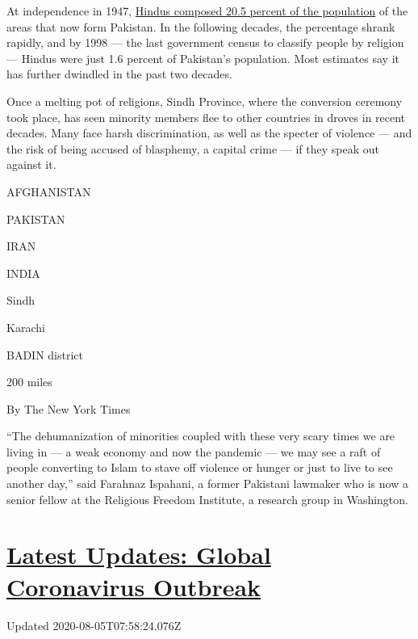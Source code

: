 At independence in 1947,
\href{https://theprint.in/opinion/modi-critics-decry-india-mistreating-minorities-but-cant-whitewash-pak-islamisation/355536/}{Hindus
composed 20.5 percent of the population} of the areas that now form
Pakistan. In the following decades, the percentage shrank rapidly, and
by 1998 --- the last government census to classify people by religion
--- Hindus were just 1.6 percent of Pakistan's population. Most
estimates say it has further dwindled in the past two decades.

Once a melting pot of religions, Sindh Province, where the conversion
ceremony took place, has seen minority members flee to other countries
in droves in recent decades. Many face harsh discrimination, as well as
the specter of violence --- and the risk of being accused of blasphemy,
a capital crime --- if they speak out against it.

AFGHANISTAN

PAKISTAN

IRAN

INDIA

Sindh

Karachi

BADIN district

200 miles

By The New York Times

``The dehumanization of minorities coupled with these very scary times
we are living in --- a weak economy and now the pandemic --- we may see
a raft of people converting to Islam to stave off violence or hunger or
just to live to see another day,'' said Farahnaz Ispahani, a former
Pakistani lawmaker who is now a senior fellow at the Religious Freedom
Institute, a research group in Washington.

\hypertarget{latest-updates-global-coronavirus-outbreak}{%
\section{\texorpdfstring{\href{https://www.nytimes3xbfgragh.onion/2020/08/04/world/coronavirus-cases.html?action=click\&pgtype=Article\&state=default\&region=MAIN_CONTENT_1\&context=storylines_live_updates}{Latest
Updates: Global Coronavirus
Outbreak}}{Latest Updates: Global Coronavirus Outbreak}}\label{latest-updates-global-coronavirus-outbreak}}

Updated 2020-08-05T07:58:24.076Z

